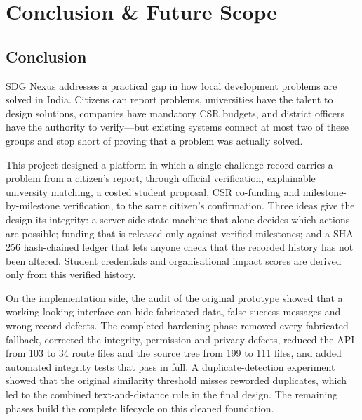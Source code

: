 \chapter{Conclusion \& Future Scope}

\section{Conclusion}
SDG Nexus addresses a practical gap in how local development problems are solved in India. Citizens can report problems, universities have the talent to design solutions, companies have mandatory CSR budgets, and district officers have the authority to verify---but existing systems connect at most two of these groups and stop short of proving that a problem was actually solved.

This project designed a platform in which a single challenge record carries a problem from a citizen's report, through official verification, explainable university matching, a costed student proposal, CSR co-funding and milestone-by-milestone verification, to the same citizen's confirmation. Three ideas give the design its integrity: a server-side state machine that alone decides which actions are possible; funding that is released only against verified milestones; and a SHA-256 hash-chained ledger that lets anyone check that the recorded history has not been altered. Student credentials and organisational impact scores are derived only from this verified history.

On the implementation side, the audit of the original prototype showed that a working-looking interface can hide fabricated data, false success messages and wrong-record defects. The completed hardening phase removed every fabricated fallback, corrected the integrity, permission and privacy defects, reduced the API from 103 to 34 route files and the source tree from 199 to 111 files, and added automated integrity tests that pass in full. A duplicate-detection experiment showed that the original similarity threshold misses reworded duplicates, which led to the combined text-and-distance rule in the final design. The remaining phases build the complete lifecycle on this cleaned foundation.

